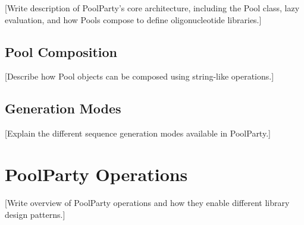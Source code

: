 \documentclass[11pt]{article}
\begin{document}
%

[Write description of PoolParty's core architecture, including the Pool class,
lazy evaluation, and how Pools compose to define oligonucleotide libraries.]

\subsection{Pool Composition}
\label{subsec:pool-composition}

%

[Describe how Pool objects can be composed using string-like operations.]

\subsection{Generation Modes}
\label{subsec:generation-modes}

%

[Explain the different sequence generation modes available in PoolParty.]



\section{PoolParty Operations}
\label{sec:poolparty-operations}

%

[Write overview of PoolParty operations and how they enable different 
library design patterns.]
\end{document}

